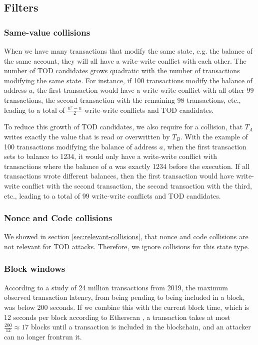 \documentclass[draft,final]{vutinfth} %
\begin{document}
\subsection{Filters}

\subsubsection{Same-value collisions}

When we have many transactions that modify the same state, e.g. the balance of the same account, they will all have a write-write conflict with each other. The number of TOD candidates grows quadratic with the number of transactions modifying the same state. For instance, if 100 transactions modify the balance of address $a$, the first transaction would have a write-write conflict with all other 99 transactions, the second transaction with the remaining 98 transactions, etc., leading to a total of $\frac{n^2-n}{2}$ write-write conflicts and TOD candidates.

To reduce this growth of TOD candidates, we also require for a collision, that $T_A$ writes exactly the value that is read or overwritten by $T_B$. With the example of 100 transactions modifying the balance of address $a$, when the first transaction sets to balance to 1234, it would only have a write-write conflict with transactions where the balance of $a$ was exactly 1234 before the execution. If all transactions wrote different balances, then the first transaction would have write-write conflict with the second transaction, the second transaction with the third, etc., leading to a total of $99$ write-write conflicts and TOD candidates.

\subsubsection{Nonce and Code collisions}

We showed in section \ref{sec:relevant-collisions}, that nonce and code collisions are not relevant for TOD attacks. Therefore, we ignore collisions for this state type.

\subsubsection{Block windows}


According to a study of 24 million transactions from 2019, the maximum observed transaction latency, from being pending to being included in a block, was below 200 seconds. If we combine this with the current block time, which is 12 seconds per block according to Etherscan \cite{etherscanio_ethereum_2024}, a transaction takes at most $\frac{200}{12} \approx 17$ blocks until a transaction is included in the blockchain, and an attacker can no longer frontrun it.
\end{document}
